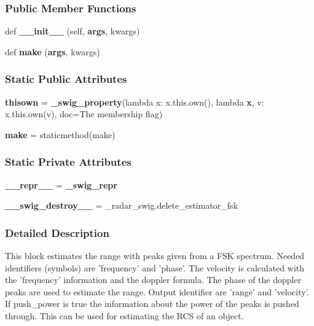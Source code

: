 \subsubsection*{Public Member Functions}
\begin{DoxyCompactItemize}
\item 
def {\bf \+\_\+\+\_\+init\+\_\+\+\_\+} (self, {\bf args}, kwargs)
\item 
def {\bf make} ({\bf args}, kwargs)
\end{DoxyCompactItemize}
\subsubsection*{Static Public Attributes}
\begin{DoxyCompactItemize}
\item 
{\bf thisown} = {\bf \+\_\+swig\+\_\+property}(lambda x\+: x.\+this.\+own(), lambda {\bf x}, v\+: x.\+this.\+own(v), doc=\textquotesingle{}The membership flag\textquotesingle{})
\item 
{\bf make} = staticmethod(make)
\end{DoxyCompactItemize}
\subsubsection*{Static Private Attributes}
\begin{DoxyCompactItemize}
\item 
{\bf \+\_\+\+\_\+repr\+\_\+\+\_\+} = {\bf \+\_\+swig\+\_\+repr}
\item 
{\bf \+\_\+\+\_\+swig\+\_\+destroy\+\_\+\+\_\+} = \+\_\+radar\+\_\+swig.\+delete\+\_\+estimator\+\_\+fsk
\end{DoxyCompactItemize}


\subsubsection{Detailed Description}
\begin{DoxyVerb}This block estimates the range with peaks given from a FSK spectrum. Needed identifiers (symbols) are 'frequency' and 'phase'. The velocity is calculated with the 'frequency' information and the doppler formula. The phase of the doppler peaks are used to estimate the range. Output identifier are 'range' and 'velocity'. If push_power is true the information about the power of the peaks is pushed through. This can be used for estimating the RCS of an object.\end{DoxyVerb}
 

